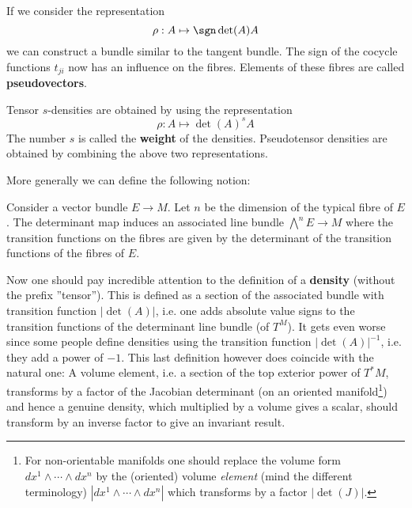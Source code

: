	\begin{example}[Pseudovectors]
		If we consider the representation
		\begin{equation}
			\rho:A\mapsto \sgn\det(A)A
		\end{equation}
		we can construct a bundle similar to the tangent bundle. The sign of the cocycle functions $t_{ji}$ now has an influence on the fibres. Elements of these fibres are called \textbf{pseudovectors}.
	\end{example}
	\begin{example}
		Tensor $s$-densities are obtained by using the representation
		\begin{equation}
			\rho:A\mapsto \det(A)^sA
		\end{equation}
		The number $s$ is called the \textbf{weight} of the densities. Pseudotensor densities are obtained by combining the above two representations.
	\end{example}
	
	More generally we can define the following notion:
	\begin{construct}
		Consider a vector bundle $E\rightarrow M$. Let $n$ be the dimension of the typical fibre of $E$. The determinant map induces an associated line bundle $\bigwedge^nE\rightarrow M$ where the transition functions on the fibres are given by the determinant of the transition functions of the fibres of $E$.
	\end{construct}
	
		\begin{remark}[Densities]
		Now one should pay incredible attention to the definition of a \textbf{density} (without the prefix ''tensor''). This is defined as a section of the associated bundle with transition function $|\det(A)|$, i.e. one adds absolute value signs to the transition functions of the determinant line bundle (of $T^M$). It gets even worse since some people define densities using the transition function $|\det(A)|^{-1}$, i.e. they add a power of $-1$. This last definition however does coincide with the natural one: A volume element, i.e. a section of the top exterior power of $T^*M$, transforms by a factor of the Jacobian determinant (on an oriented manifold\footnote{For non-orientable manifolds one should replace the volume form $dx^1\wedge\cdots\wedge dx^n$ by the (oriented) volume \textit{element} (mind the different terminology) $|dx^1\wedge\cdots\wedge dx^n|$ which transforms by a factor $|\det(J)|$.}) and hence a genuine density, which multiplied by a volume gives a scalar, should transform by an inverse factor to give an invariant result.
	\end{remark}
	
